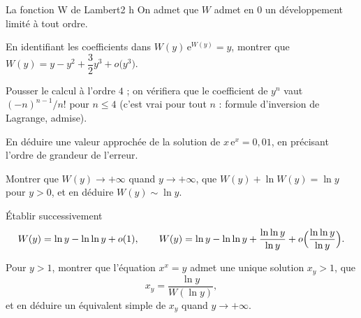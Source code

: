 \begin{defi}{La fonction W de Lambert}{2 h}
On admet que $W$ admet en $0$ un développement limité à tout ordre.
\begin{questions}[resume]
  \item En identifiant les coefficients dans $W(y)\,\mathrm{e}^{W(y)}=y$,
    montrer que $W(y)=y-y^{2}+\dfrac32y^{3}+o\bigl(y^{3}\bigr)$.
  \item Pousser le calcul à l'ordre $4$ ; on vérifiera que le coefficient
    de $y^{n}$ vaut $(-n)^{n-1}/n!$ pour $n\leqslant4$ (c'est vrai pour
    tout $n$ : formule d'inversion de Lagrange, admise).
  \item En déduire une valeur approchée de la solution de
    $x\,\mathrm{e}^{x}=0{,}01$, en précisant l'ordre de grandeur de
    l'erreur.
\end{questions}

\begin{questions}[resume]
  \item Montrer que $W(y)\to+\infty$ quand $y\to+\infty$, que
    $W(y)+\ln W(y)=\ln y$ pour $y>0$, et en déduire $W(y)\sim\ln y$.
  \item Établir successivement
    \[
    W(y)=\ln y-\ln\ln y+o(1),
    \qquad
    W(y)=\ln y-\ln\ln y+\frac{\ln\ln y}{\ln y}
    +o\Bigl(\frac{\ln\ln y}{\ln y}\Bigr).
    \]
  \item Pour $y>1$, montrer que l'équation $x^{x}=y$ admet une unique
    solution $x_y>1$, que
    \[
    x_y=\frac{\ln y}{W(\ln y)},
    \]
    et en déduire un équivalent simple de $x_y$ quand $y\to+\infty$.
\end{questions}
\end{defi}
